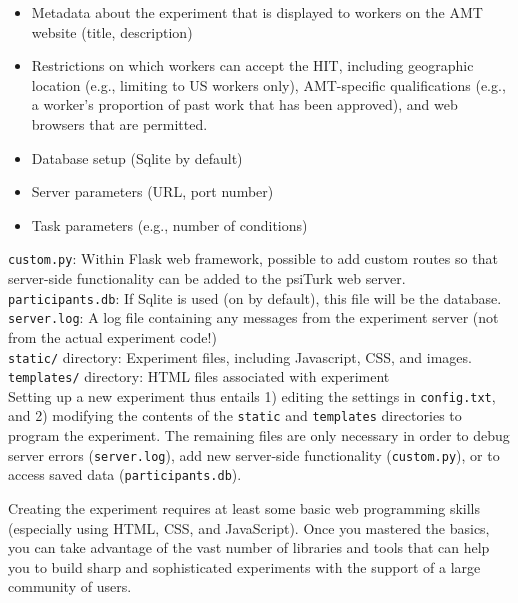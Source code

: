 \documentclass[twocolumn]{svjour3}          %
\begin{document}
\begin{itemize}
\item Metadata about the experiment that is displayed to workers on the AMT website (title, description)
\item Restrictions on which workers can accept the HIT, including geographic location (e.g., limiting to US workers only), AMT-specific qualifications (e.g., a worker's proportion of past work that has been approved), and web browsers that are permitted.
\item Database setup (Sqlite by default)
\item Server parameters (URL, port number)
\item Task parameters (e.g., number of conditions)
\end{itemize}


\noindent \texttt{custom.py}: Within Flask web framework, possible to add custom routes so that server-side functionality can be added to the psiTurk web server. \\ 

\noindent \texttt{participants.db}: If Sqlite is used (on by default), this file will be the database. \\

\noindent \texttt{server.log}: A log file containing any messages from the experiment server (not from the actual experiment code!) \\ 

\noindent \texttt{static/} directory: Experiment files, including Javascript, CSS, and images. \\

\noindent \texttt{templates/} directory: HTML files associated with experiment \\


Setting up a new experiment thus entails 1) editing the settings in \texttt{config.txt}, and 2) modifying the contents of the \texttt{static} and \texttt{templates} directories to program the experiment.
The remaining files are only necessary in order to debug server errors (\texttt{server.log}), add new server-side functionality (\texttt{custom.py}), or to access saved data (\texttt{participants.db}).

Creating the experiment requires at least some basic web programming skills (especially using HTML, CSS, and JavaScript).
Once you mastered the basics, you can take advantage of the vast number of libraries and tools that can help you to build sharp and sophisticated experiments with the support of a large community of users.
\end{document}
